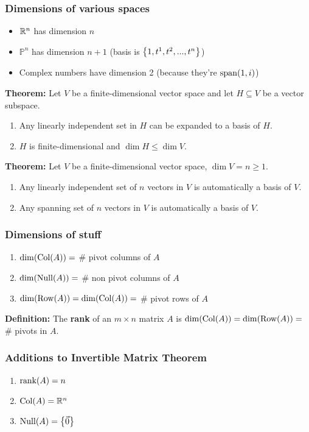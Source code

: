 \subsubsection*{Dimensions of various spaces}

\begin{itemize}
    \item $\mathbb{R}^n$ has dimension $n$
    \item $\mathbb{P}^n$ has dimension $n+1$ (basis is $\left\{1, t^1, t^2, ..., t^n\right\}$)
    \item Complex numbers have dimension 2 (because they're $\mathrm{span}(1, i)$)
\end{itemize}

\textbf{Theorem:} Let $V$ be a finite-dimensional vector space and let $H \subseteq V$ be a vector subspace.
\begin{enumerate}
    \item Any linearly independent set in $H$ can be expanded to a basis of $H$.
    \item $H$ is finite-dimensional and $\dim H \leq \dim V$.
\end{enumerate}

\textbf{Theorem:} Let $V$ be a finite-dimensional vector space, $\dim V = n \geq 1$.
\begin{enumerate}
    \item Any linearly independent set of $n$ vectors in $V$ is automatically a basis of $V$.
    \item Any spanning set of $n$ vectors in $V$ is automatically a basis of $V$.
\end{enumerate}

\subsubsection*{Dimensions of stuff}
\begin{enumerate}
    \item $\dim(\operatorname{Col}(A)) =$ \# pivot columns of $A$
    \item $\dim(\operatorname{Null}(A)) =$ \# non pivot columns of $A$
    \item $\dim(\operatorname{Row}(A)) = \dim(\operatorname{Col}(A)) =$ \# pivot rows of $A$
\end{enumerate}

\textbf{Definition:} The \textbf{rank} of an $m \times n$ matrix $A$ is $\dim(\operatorname{Col}(A)) = \dim(\operatorname{Row}(A)) = $ \# pivots in $A$.

\subsubsection*{Additions to Invertible Matrix Theorem}
\begin{enumerate}
    \item $\operatorname{rank}(A) = n$
    \item $\operatorname{Col}(A) = \mathbb{R}^n$
    \item $\operatorname{Null}(A) = \left\{\vec 0\right\}$
\end{enumerate}

